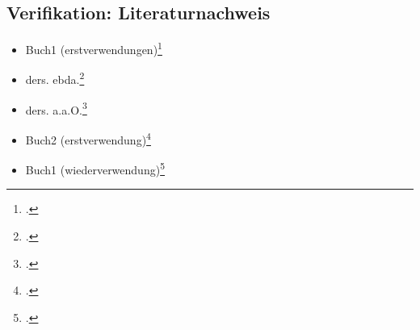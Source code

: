 \documentclass[
  DIV=calc,
  BCOR=5mm,
  11pt,
  headings=small,
  oneside,
  abstract=true,
  toc=bib,
  english,ngerman]{scrartcl}
\begin{document}
\subsection{Verifikation: Literaturnachweis}
\begin{itemize}
  \item Buch1 (erstverwendungen)\footcite[vgl.][15]{KantKdrV1974}
  \item ders. ebda.\footcite[vgl.][15]{KantKdrV1974}
  \item ders. a.a.O.\footcite[vgl.][23]{KantKdrV1974}
  \item Buch2 (erstverwendung)\footcite[vgl.][15]{KantKdU1974}
  \item Buch1 (wiederverwendung)\footcite[vgl.][15]{KantKdrV1974}
\end{itemize}



\printnomenclature
\printbibliography
\end{document}
